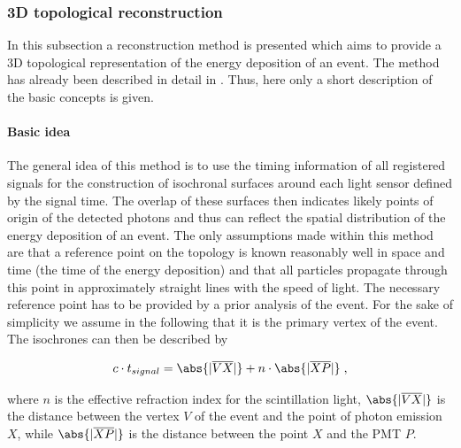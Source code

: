 \subsubsection{3D topological reconstruction}

In this subsection a reconstruction method is presented which aims to provide a 3D topological representation of the energy 
deposition of an event. The method has already been described in detail in \cite{Wonsak:2018uby}. Thus, here only a short description of the
basic concepts is given.

\paragraph{Basic idea}

The general idea of this method is to use the timing information of all registered signals for the construction of isochronal surfaces around each 
  light sensor defined by the signal time. The overlap of these surfaces then indicates likely points of origin of the detected photons 
  and thus can reflect the spatial distribution of the energy deposition of an event. The only assumptions made within this method are 
  that a reference point on the topology is known reasonably well in space and time (the time of the energy deposition) and that all 
  particles propagate through this point in approximately straight lines with the speed of light. The necessary reference point has to be
  provided by a prior analysis of the event. For the sake of simplicity we assume in the following that it is the primary 
vertex of the event. The isochrones can then be described by 


 \begin{equation}
   \label{Eq:Drop-like_shape}
  c \cdot t_{signal} = \abs{|\overline{VX}|} + n \cdot \abs{|\overline{XP}|} \; ,
 \end{equation}
 
 where
  $n$ is the effective refraction index for the scintillation light, $\abs{|\overline{VX}|}$ is the distance between the vertex $V$ of 
  the event and the point of photon emission $X$, while $\abs{|\overline{XP}|}$ is the distance between the point $X$ and the PMT $P$. 
  
  

